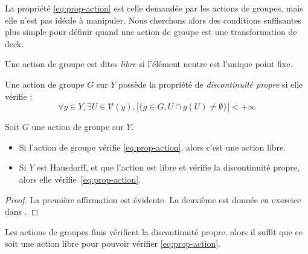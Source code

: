 La propriété \eqref{eq:prop-action} est celle demandée par les actions de groupes, mais elle n'est pas idéale à manipuler. Nous cherchons alors des conditions suffisantes plus simple pour définir quand une action de groupe est une transformation de deck.

\begin{definition}
Une action de groupe est dites \emph{libre} si l'élément neutre est l'unique point fixe.

Une action de groupe $G$ sur $Y$ possède la propriété de \emph{discontinuité propre} si elle vérifie : \[\forall y\in Y,\exists U\in\mathcal{V}(y), |\{g\in G,U\cap g(U)\neq\emptyset\}|<+\infty\]
\end{definition}

\begin{proposition}
Soit $G$ une action de groupe sur $Y$.\begin{itemize}
    \item Si l'action de groupe vérifie \eqref{eq:prop-action}, alors c'est une action libre.
    \item Si $Y$ est Hausdorff, et que l'action est libre et vérifie la discontinuité propre, alors elle vérifie~\eqref{eq:prop-action}.
\end{itemize}
\end{proposition}
\begin{proof}
La première affirmation est évidente. La deuxième est donnée en exercice dans \cite{Hatcher}.
\end{proof}

\begin{exemple}
Les actions de groupes finis vérifient la discontinuité propre, alors il suffit que ce soit une action libre pour pouvoir vérifier \eqref{eq:prop-action}.
\end{exemple}